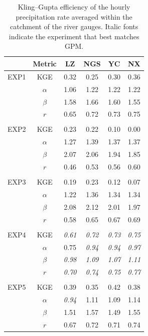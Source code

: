 \documentclass[draft]{agujournal2019}
\begin{document}
\begin{table}[h!]
      \centering
      \doublerulesep 0.3pt
      \renewcommand{\arraystretch}{1}  %
      \caption{Kling--Gupta efficiency of the hourly precipitation rate averaged within the catchment of the river gauges. Italic fonts indicate the experiment that best matches GPM.}
      \label{tab:pr_skill}
      \vspace*{5mm}
      \small
      \begin{tabular*}{80mm}{cccccc}
            \hline
            & Metric & LZ & NGS & YC & NX \\
            \hline
            EXP1 & KGE & 0.32 & 0.25 & 0.30 & 0.36 \\
            & $\alpha$ & 1.06 & 1.22 & 1.22 & 1.22 \\
            & $\beta$ & 1.58 & 1.66 & 1.60 & 1.55 \\
            & $r$ & 0.65 & 0.72 & 0.73 & 0.75 \\
            \\
            EXP2 & KGE & \textminus{}0.23 & \textminus{}0.22 & \textminus{}0.10 & 0.00 \\
            & $\alpha$ & 1.27 & 1.39 & 1.37 & 1.37 \\
            & $\beta$ & 2.07 & 2.06 & 1.94 & 1.85 \\
            & $r$ & 0.46 & 0.53 & 0.56 & 0.60 \\
            \\
            EXP3 & KGE & \textminus{}0.19 & \textminus{}0.23 & \textminus{}0.12 & \textminus{}0.07 \\
            & $\alpha$ & 1.22 & 1.36 & 1.34 & 1.34 \\
            & $\beta$ & 2.08 & 2.12 & 2.01 & 1.97 \\
            & $r$ & 0.58 & 0.65 & 0.67 & 0.69 \\
            \\
            EXP4 & KGE & \textit{0.61} & \textit{0.72} & \textit{0.73} & \textit{0.75} \\
            & $\alpha$ & 0.75 & \textit{0.94} & \textit{0.94} & \textit{0.97} \\
            & $\beta$ & \textit{0.98} & \textit{1.09} & \textit{1.07} & \textit{1.11} \\
            & $r$ & \textit{0.70} & \textit{0.74} & \textit{0.75} & \textit{0.77} \\
            \\
            EXP5 & KGE & 0.39 & 0.35 & 0.42 & 0.38 \\
            & $\alpha$ & \textit{0.94} & 1.11 & 1.09 & 1.14 \\
            & $\beta$ & 1.51 & 1.57 & 1.49 & 1.55 \\
            & $r$ & 0.67 & 0.72 & 0.71 & 0.74 \\
            \hline
      \end{tabular*}
      \renewcommand{\arraystretch}{1}  %
\end{table}
\end{document}
